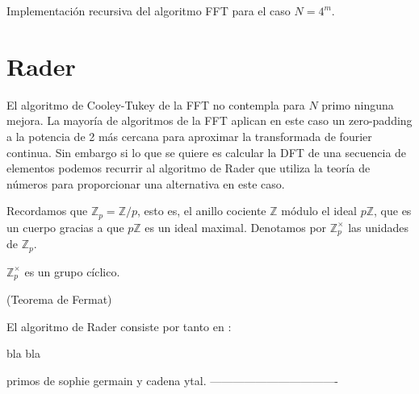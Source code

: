 Implementación recursiva del  algoritmo FFT para el caso $N=4^m$.









\section{Rader}
El algoritmo de Cooley-Tukey de la FFT no contempla para $N$ primo ninguna mejora.
La mayoría de algoritmos de la FFT aplican en este caso un zero-padding  a la potencia de 2 más cercana para aproximar la transformada de fourier continua.
Sin embargo si lo que se quiere es calcular la DFT de una secuencia de elementos podemos recurrir al algoritmo de Rader que utiliza la teoría de números  para proporcionar una alternativa en este caso.


Recordamos que  $\mathbb{Z}_p = \mathbb{Z}/p$, esto es, el anillo cociente $\mathbb{Z}$ módulo el ideal  ${p\mathbb{Z}}$, que es un cuerpo gracias a que $p\mathbb{Z}$ es un ideal maximal.
Denotamos por $\mathbb{Z}_p^\times$ las unidades de 
$\mathbb{Z}_p.$

\begin{teorema}
        $\mathbb{Z}_p^\times$ es un grupo cíclico.
\end{teorema}

\begin{teorema}
    (Teorema de Fermat)
\end{teorema}

El algoritmo de Rader consiste por tanto en :
 



bla bla


primos de sophie germain y cadena ytal.
----------------------------------



 








